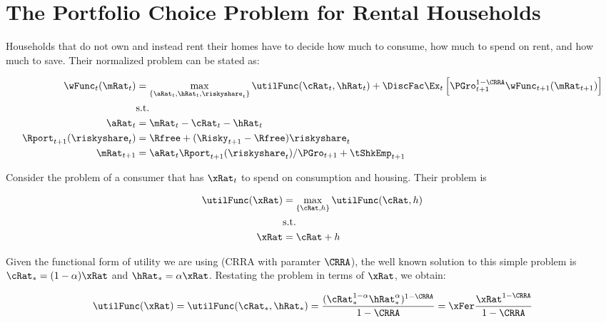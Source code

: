 \documentclass[PortfolioChoiceWithRiskyHousing]{subfiles}
\begin{document}
\section{The Portfolio Choice Problem for Rental Households}

Households that do not own and instead rent their homes have to decide how much to consume, how much to spend on rent, and how much to save. Their normalized problem can be stated as:

\begin{equation}
	\begin{split}
		\wFunc_{t}(\mRat_{t}) & = \max_{\{\aRat_{t}, \hRat_{t}, \riskyshare_{t}\}} \utilFunc(\cRat_{t}, \hRat_{t}) + \DiscFac \Ex_{t} \left[ \PGro_{t+1}^{1-\CRRA} \wFunc_{t+1}(\mRat_{t+1}) \right] \\
		& \text{s.t.} \\
		\aRat_{t} & = \mRat_{t} - \cRat_{t} - \hRat_{t} \\
		\Rport_{t+1}(\riskyshare_{t}) & = \Rfree + (\Risky_{t+1} - \Rfree)\riskyshare_{t} \\
		\mRat_{t+1} & = \aRat_{t}\Rport_{t+1}(\riskyshare_{t})/\PGro_{t+1} + \tShkEmp_{t+1}
	\end{split}
\end{equation}

Consider the problem of a consumer that has $\xRat_{t}$ to spend on consumption and housing. Their problem is

\begin{equation}
	\begin{split}
		\utilFunc(\xRat) & = \max_{\{\cRat, h\}} \utilFunc(\cRat, h) \\
		& \text{s.t.} \\
		\xRat & = \cRat + h
	\end{split}
\end{equation}

%

Given the functional form of utility we are using (CRRA with paramter $\CRRA$), the well known solution to this simple problem is $\cRat_{*} = (1-\alpha)\xRat$ and $\hRat_{*} = \alpha \xRat$. Restating the problem in terms of $\xRat$, we obtain:

\begin{equation}
	\utilFunc(\xRat) = \utilFunc(\cRat_{*}, \hRat_{*}) = \frac{(\cRat_{*}^{1-\alpha}\hRat_{*}^{\alpha})^{1-\CRRA}}{1-\CRRA} = \xFer \frac{\xRat^{1-\CRRA}}{1-\CRRA}
\end{equation}
\end{document}
